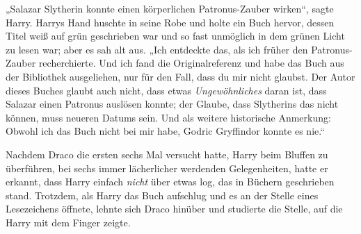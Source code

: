 „Salazar Slytherin konnte einen körperlichen Patronus-Zauber wirken“, sagte Harry. Harrys Hand huschte in seine Robe und holte ein Buch hervor, dessen Titel weiß auf grün geschrieben war und so fast unmöglich in dem grünen Licht zu lesen war; aber es sah alt aus. „Ich entdeckte das, als ich früher den Patronus-Zauber recherchierte. Und ich fand die Originalreferenz und habe das Buch aus der Bibliothek ausgeliehen, nur für den Fall, dass du mir nicht glaubst. Der Autor dieses Buches glaubt auch nicht, dass etwas \emph{Ungewöhnliches} daran ist, dass Salazar einen Patronus auslösen konnte; der Glaube, dass Slytherins das nicht können, muss neueren Datums sein. Und als weitere historische Anmerkung: Obwohl ich das Buch nicht bei mir habe, Godric Gryffindor konnte es nie.“

Nachdem Draco die ersten sechs Mal versucht hatte, Harry beim Bluffen zu überführen, bei sechs immer lächerlicher werdenden Gelegenheiten, hatte er erkannt, dass Harry einfach \emph{nicht} über etwas log, das in Büchern geschrieben stand. Trotzdem, als Harry das Buch aufschlug und es an der Stelle eines Lesezeichens öffnete, lehnte sich Draco hinüber und studierte die Stelle, auf die Harry mit dem Finger zeigte.

